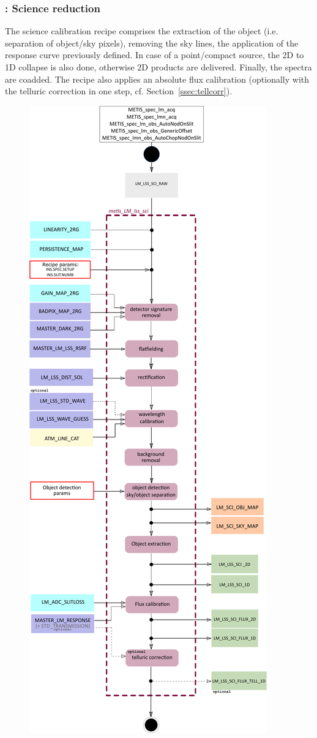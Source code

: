 \subsubsection{:  Science reduction}\label{rec:metis_lm_lss_sci}
The science calibration recipe comprises the extraction of the object (i.e. separation of object/sky pixels), removing the sky lines, the application of the response curve previously defined. In case of a point/compact source, the 2D to 1D collapse is also done, otherwise 2D products are delivered. Finally, the spectra are coadded. The recipe also applies an absolute flux calibration (optionally with the telluric correction in one step, cf. Section~\ref{ssec:tellcorr}).
\begin{figure}[ht]
  \centering
  \includegraphics[width=0.36\textheight]{figures/metis_lm_lss_sci_v0.83.pdf}

\end{figure}
